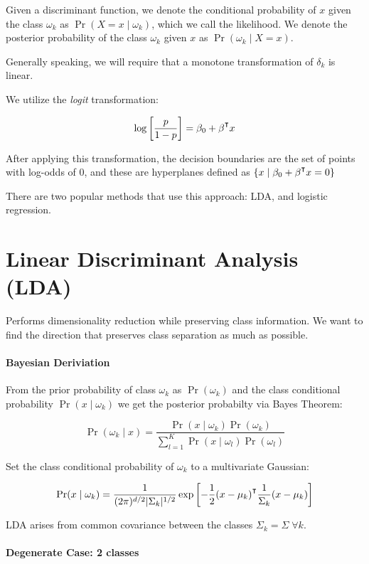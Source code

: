 \documentclass{idc_msc}
\renewcommand{\T}{{\mathpalette\raiseT\intercal}} %
\begin{document}
Given a discriminant function, we denote the conditional probability of \(x\) given the class \(\omega_k\) as \(\Pr(X = x \mid \omega_k)\), which we call the likelihood.
We denote the posterior probability of the class \(\omega_k\) given \(x\) as \(\Pr(\omega_k \mid X = x)\).

Generally speaking, we will require that a monotone transformation of \(\delta_k\) is linear.

We utilize the \emph{logit} transformation:

\[\log\left[\frac{p}{1-p}\right] = \beta_0 + \beta^\T x\]

After applying this transformation, the decision boundaries are the set of points with log-odds of 0, and these are hyperplanes defined as \(\{x \mid \beta_0 + \beta^\T x = 0\}\)

There are two popular methods that use this approach: LDA, and logistic regression.

\section{Linear Discriminant Analysis (LDA)}

Performs dimensionality reduction while preserving class information.
We want to find the direction that preserves class separation as much as possible.

\paragraph{Bayesian Deriviation}

From the prior probability of class \(\omega_k\) as \(\Pr(\omega_k)\) and the class conditional probability \(\Pr(x \mid \omega_k)\) we get the posterior probabilty via Bayes Theorem:

\[\Pr(\omega_k \mid x) = \frac{\Pr(x \mid \omega_k)\Pr(\omega_k)}{\sum_{l=1}^K \Pr(x \mid \omega_l) \Pr(\omega_l)}\]

Set the class conditional probability of \(\omega_k\) to a multivariate Gaussian:

\[\Pr(x \mid \omega_k) = \frac{1}{(2\pi)^{d/2} |\Sigma_k|^{1/2}} \exp \left[- \frac{1}{2}(x-\mu_k)^\T \frac{1}{\Sigma_k} (x - \mu_k) \right]\]

LDA arises from common covariance between the classes \(\Sigma_k = \Sigma\; \forall k\).

\paragraph{Degenerate Case: 2 classes}
\end{document}

